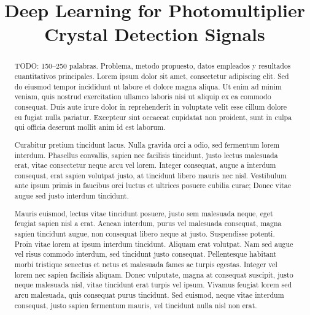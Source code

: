 \documentclass[10pt,conference]{IEEEtran}
\begin{document}
\setcounter{page}{1}



\title{Deep Learning for Photomultiplier Crystal Detection Signals}

\author{%
}

\maketitle
\pagestyle{tfmplain}

\begin{abstract}
TODO: 150--250 palabras. Problema, metodo propuesto, datos empleados y
resultados cuantitativos principales.
Lorem ipsum dolor sit amet, consectetur adipiscing elit. Sed do eiusmod tempor incididunt ut labore et dolore magna aliqua. Ut enim ad minim veniam, quis nostrud exercitation ullamco laboris nisi ut aliquip ex ea commodo consequat. Duis aute irure dolor in reprehenderit in voluptate velit esse cillum dolore eu fugiat nulla pariatur. Excepteur sint occaecat cupidatat non proident, sunt in culpa qui officia deserunt mollit anim id est laborum.

Curabitur pretium tincidunt lacus. Nulla gravida orci a odio, sed fermentum lorem interdum. Phasellus convallis, sapien nec facilisis tincidunt, justo lectus malesuada erat, vitae consectetur neque arcu vel lorem. Integer consequat, augue a interdum consequat, erat sapien volutpat justo, at tincidunt libero mauris nec nisl. Vestibulum ante ipsum primis in faucibus orci luctus et ultrices posuere cubilia curae; Donec vitae augue sed justo interdum tincidunt.

Mauris euismod, lectus vitae tincidunt posuere, justo sem malesuada neque, eget feugiat sapien nisl a erat. Aenean interdum, purus vel malesuada consequat, magna sapien tincidunt augue, non consequat libero neque at justo. Suspendisse potenti. Proin vitae lorem at ipsum interdum tincidunt. Aliquam erat volutpat. Nam sed augue vel risus commodo interdum, sed tincidunt justo consequat. Pellentesque habitant morbi tristique senectus et netus et malesuada fames ac turpis egestas. Integer vel lorem nec sapien facilisis aliquam. Donec vulputate, magna at consequat suscipit, justo neque malesuada nisl, vitae tincidunt erat turpis vel ipsum. Vivamus feugiat lorem sed arcu malesuada, quis consequat purus tincidunt. Sed euismod, neque vitae interdum consequat, justo sapien fermentum mauris, vel tincidunt nulla nisl non erat.

\end{abstract}
\end{document}
